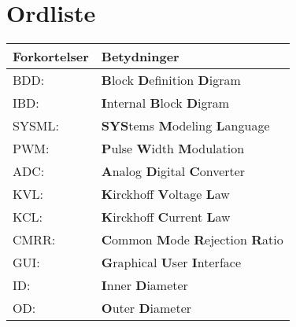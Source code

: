 \section*{Ordliste}
\begin{center}
		\begin{longtable}{ | m{6.5cm} | m{6.5cm}| } 
			\hline
			\textbf{Forkortelser} &\textbf{Betydninger} \\ 
			\hline
			BDD: & \textbf{B}lock \textbf{D}efinition \textbf{D}igram \\
			\hline
			IBD: & \textbf{I}nternal \textbf{B}lock \textbf{D}igram \\  
			\hline
			SYSML: & \textbf{SYS}tems \textbf{M}odeling \textbf{L}anguage \\ 
			\hline
			PWM: & \textbf{P}ulse \textbf{W}idth \textbf{M}odulation \\ 
			\hline	
				
				ADC: & \textbf{A}nalog \textbf{D}igital \textbf{C}onverter  \\ 
				
			\hline
			KVL: & \textbf{K}irckhoff \textbf{V}oltage \textbf{L}aw \\ 
			
			\hline
			KCL: & \textbf{K}irckhoff \textbf{C}urrent \textbf{L}aw \\ 
			
			\hline
			CMRR: & \textbf{C}ommon \textbf{M}ode \textbf{R}ejection \textbf{R}atio \\ 
			
			\hline
			GUI: & \textbf{G}raphical \textbf{U}ser \textbf{I}nterface \\ 
			
			\hline
			ID: & \textbf{I}nner \textbf{D}iameter \\ 
			
			\hline
			OD: & \textbf{O}uter \textbf{D}iameter \\ 
			
			\hline
		\end{longtable}
\end{center}
